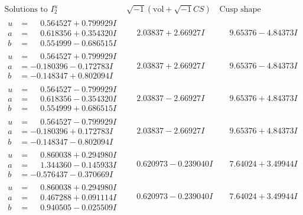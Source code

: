 \documentclass[1p]{elsarticle_modified}
\theoremstyle{definition}
\newcommand{\I}{\sqrt{-1}}
\begin{document}
$$\begin{array}{c|c|c}  
\text{Solutions to }I^u_{2}& \I (\text{vol} + \sqrt{-1}CS) & \text{Cusp shape}\\
 \hline 
\begin{aligned}
u &= \phantom{-}0.564527 + 0.799929 I \\
a &= \phantom{-}0.618356 + 0.354320 I \\
b &= \phantom{-}0.554999 - 0.686515 I\end{aligned}
 & \phantom{-}2.03837 + 2.66927 I & \phantom{-}9.65376 - 4.84373 I \\ \hline\begin{aligned}
u &= \phantom{-}0.564527 + 0.799929 I \\
a &= -0.180396 - 0.172783 I \\
b &= -0.148347 + 0.802094 I\end{aligned}
 & \phantom{-}2.03837 + 2.66927 I & \phantom{-}9.65376 - 4.84373 I \\ \hline\begin{aligned}
u &= \phantom{-}0.564527 - 0.799929 I \\
a &= \phantom{-}0.618356 - 0.354320 I \\
b &= \phantom{-}0.554999 + 0.686515 I\end{aligned}
 & \phantom{-}2.03837 - 2.66927 I & \phantom{-}9.65376 + 4.84373 I \\ \hline\begin{aligned}
u &= \phantom{-}0.564527 - 0.799929 I \\
a &= -0.180396 + 0.172783 I \\
b &= -0.148347 - 0.802094 I\end{aligned}
 & \phantom{-}2.03837 - 2.66927 I & \phantom{-}9.65376 + 4.84373 I \\ \hline\begin{aligned}
u &= \phantom{-}0.860038 + 0.294980 I \\
a &= \phantom{-}1.344360 - 0.145933 I \\
b &= -0.576437 - 0.370669 I\end{aligned}
 & \phantom{-}0.620973 - 0.239040 I & \phantom{-}7.64024 + 3.49944 I \\ \hline\begin{aligned}
u &= \phantom{-}0.860038 + 0.294980 I \\
a &= \phantom{-}0.467288 + 0.091114 I \\
b &= \phantom{-}0.940505 - 0.025509 I\end{aligned}
 & \phantom{-}0.620973 - 0.239040 I & \phantom{-}7.64024 + 3.49944 I \\ \hline\begin{aligned}

\end{aligned}
\end{array}$$
\end{document}
